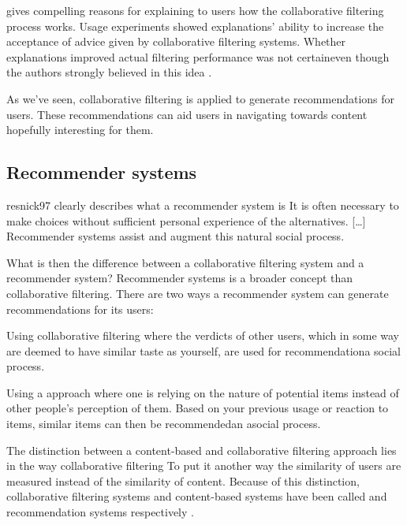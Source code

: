 \citet[]{herlocker00} gives compelling reasons for explaining to
users how the collaborative filtering process works. Usage experiments
showed explanations' ability to increase the acceptance of advice given by
collaborative filtering systems. Whether explanations improved actual
filtering performance was not certain\dash{}even though the authors
strongly believed in this idea
\citep[]{herlocker00}.

As we've seen, collaborative filtering is applied to generate
recommendations for users. These recommendations can aid users in navigating
towards content hopefully interesting for them.

\subsection{Recommender systems}
\label{section:background.social.navigation.applied.forms.recommendations}

\begin{fullquote}[\p{56}]{resnick97}{%
  clearly describes what a recommender system is}
  It is often necessary to make choices without sufficient
  personal experience of the alternatives.
  [\ldots]
  Recommender systems assist and augment this
  natural social process.
\end{fullquote}

What is then the difference between a collaborative
filtering system and a recommender system?
Recommender systems is a broader concept than collaborative
filtering. There are two ways a recommender system can generate
recommendations for its users:

\begin{enum}
  \item Using collaborative filtering
    where the verdicts of other users, which in some way are deemed to have
    similar taste as yourself, are used for recommendation\dash{}a social
    process.
  \item Using a  approach where one is relying on the
    nature of potential items instead of other people's perception of them.
    Based on your previous usage or reaction to items, similar items can then
    be recommended\dash{}an asocial process.
\end{enum}

The distinction between a content-based and collaborative filtering approach
lies in the way collaborative filtering  To put it another
way the similarity of users are measured instead of the similarity of content.
Because of this distinction, collaborative filtering systems
and content-based systems have been called  and
 recommendation systems respectively
\citep[]{greco04}.

